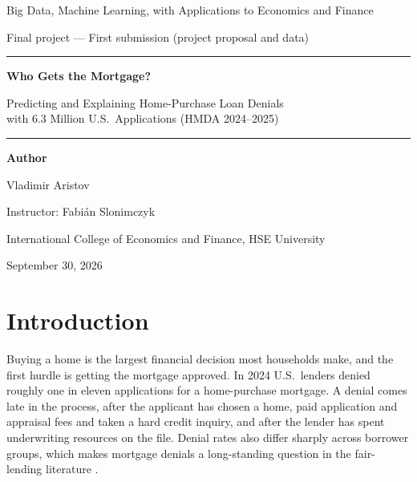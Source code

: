 \documentclass[11pt,a4paper]{article}
\begin{document}
\begin{titlepage}
\centering
\vspace*{2.2cm}
{\large Big Data, Machine Learning, with Applications to Economics and Finance\par}
\vspace{0.3cm}
{\normalsize Final project --- First submission (project proposal and data)\par}
\vspace{2.2cm}
\rule{\textwidth}{0.6pt}\par\vspace{0.5cm}
{\LARGE\bfseries Who Gets the Mortgage?\par}
\vspace{0.25cm}
{\Large Predicting and Explaining Home-Purchase Loan Denials\\ with 6.3 Million U.S.\ Applications (HMDA 2024--2025)\par}
\vspace{0.5cm}\rule{\textwidth}{0.6pt}\par
\vspace{2.2cm}
{\large\textbf{Author}\par}
\vspace{0.2cm}
{\large Vladimir Aristov\par}
\vspace{1.6cm}
{\normalsize Instructor: Fabián Slonimczyk\par}
\vspace{0.2cm}
{\normalsize International College of Economics and Finance, HSE University\par}
\vfill
{\normalsize September 30, 2026\par}
\end{titlepage}

\section{Introduction}

Buying a home is the largest financial decision most households make, and the first
hurdle is getting the mortgage approved. In 2024 U.S.\ lenders denied roughly one in eleven
applications for a home-purchase mortgage. A denial comes late in the process, after the
applicant has chosen a home, paid application and appraisal fees and taken a hard
credit inquiry, and after the lender has spent underwriting resources on the file.
Denial rates also differ sharply across borrower groups, which makes mortgage denials a
long-standing question in the fair-lending literature
\cite{munnell1996,bartlett2022,fuster2022}.
\end{document}
